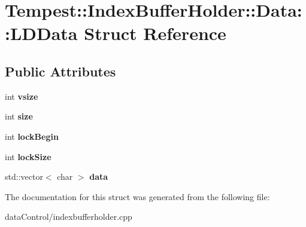 \hypertarget{struct_index_buffer_holder_1_1_data_1_1_l_d_data}{\section{Tempest\+:\+:Index\+Buffer\+Holder\+:\+:Data\+:\+:L\+D\+Data Struct Reference}
\label{struct_index_buffer_holder_1_1_data_1_1_l_d_data}
}
\subsection*{Public Attributes}
\begin{DoxyCompactItemize}
\item 
\hypertarget{struct_index_buffer_holder_1_1_data_1_1_l_d_data_a5092ebbb9cd8c03660db66977dcdc64a}{int {\bfseries vsize}}\label{struct_index_buffer_holder_1_1_data_1_1_l_d_data_a5092ebbb9cd8c03660db66977dcdc64a}

\item 
\hypertarget{struct_index_buffer_holder_1_1_data_1_1_l_d_data_a91a1a0b289e3aed0f175eff7a2904c2b}{int {\bfseries size}}\label{struct_index_buffer_holder_1_1_data_1_1_l_d_data_a91a1a0b289e3aed0f175eff7a2904c2b}

\item 
\hypertarget{struct_index_buffer_holder_1_1_data_1_1_l_d_data_af5fe2f9a4852915c9f4c2bdb90d39deb}{int {\bfseries lock\+Begin}}\label{struct_index_buffer_holder_1_1_data_1_1_l_d_data_af5fe2f9a4852915c9f4c2bdb90d39deb}

\item 
\hypertarget{struct_index_buffer_holder_1_1_data_1_1_l_d_data_a63af362e39607a1c70abb22557dc5d81}{int {\bfseries lock\+Size}}\label{struct_index_buffer_holder_1_1_data_1_1_l_d_data_a63af362e39607a1c70abb22557dc5d81}

\item 
\hypertarget{struct_index_buffer_holder_1_1_data_1_1_l_d_data_a4bc7a7d52d57d132b11bd187b010e0ed}{std\+::vector$<$ char $>$ {\bfseries data}}\label{struct_index_buffer_holder_1_1_data_1_1_l_d_data_a4bc7a7d52d57d132b11bd187b010e0ed}

\end{DoxyCompactItemize}


The documentation for this struct was generated from the following file\+:\begin{DoxyCompactItemize}
\item 
data\+Control/indexbufferholder.\+cpp\end{DoxyCompactItemize}
